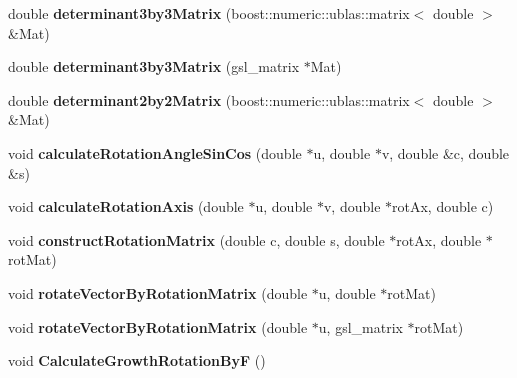 \begin{DoxyCompactItemize}
\item 
\hypertarget{classShapeBase_ad86161effaf1c7c607aba51609a99e70}{}double {\bfseries determinant3by3\+Matrix} (boost\+::numeric\+::ublas\+::matrix$<$ double $>$ \&Mat)\label{classShapeBase_ad86161effaf1c7c607aba51609a99e70}

\item 
\hypertarget{classShapeBase_af52dce091d2e8369f546df9adeb1e6c0}{}double {\bfseries determinant3by3\+Matrix} (gsl\+\_\+matrix $\ast$Mat)\label{classShapeBase_af52dce091d2e8369f546df9adeb1e6c0}

\item 
\hypertarget{classShapeBase_a32f1a594c4be91e71f567cc04290a7f5}{}double {\bfseries determinant2by2\+Matrix} (boost\+::numeric\+::ublas\+::matrix$<$ double $>$ \&Mat)\label{classShapeBase_a32f1a594c4be91e71f567cc04290a7f5}

\item 
\hypertarget{classShapeBase_a7c656b4d72103a222e3d9d4d4dc636ca}{}void {\bfseries calculate\+Rotation\+Angle\+Sin\+Cos} (double $\ast$u, double $\ast$v, double \&c, double \&s)\label{classShapeBase_a7c656b4d72103a222e3d9d4d4dc636ca}

\item 
\hypertarget{classShapeBase_acfd90d8e14946c7246e4420ca0ab6a0a}{}void {\bfseries calculate\+Rotation\+Axis} (double $\ast$u, double $\ast$v, double $\ast$rot\+Ax, double c)\label{classShapeBase_acfd90d8e14946c7246e4420ca0ab6a0a}

\item 
\hypertarget{classShapeBase_ac5ea30d81c19c9f7c904af66310c750b}{}void {\bfseries construct\+Rotation\+Matrix} (double c, double s, double $\ast$rot\+Ax, double $\ast$rot\+Mat)\label{classShapeBase_ac5ea30d81c19c9f7c904af66310c750b}

\item 
\hypertarget{classShapeBase_ad803a237b7e7c06d419a308625a599e0}{}void {\bfseries rotate\+Vector\+By\+Rotation\+Matrix} (double $\ast$u, double $\ast$rot\+Mat)\label{classShapeBase_ad803a237b7e7c06d419a308625a599e0}

\item 
\hypertarget{classShapeBase_a14a573072213ea91314c8f1101f106bb}{}void {\bfseries rotate\+Vector\+By\+Rotation\+Matrix} (double $\ast$u, gsl\+\_\+matrix $\ast$rot\+Mat)\label{classShapeBase_a14a573072213ea91314c8f1101f106bb}

\item 
\hypertarget{classShapeBase_a9ae4c5fc8817528493502e3f75c9a984}{}void {\bfseries Calculate\+Growth\+Rotation\+By\+F} ()\label{classShapeBase_a9ae4c5fc8817528493502e3f75c9a984}


\end{DoxyCompactItemize}

